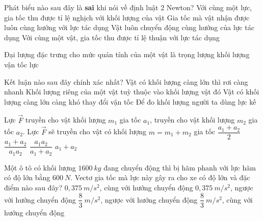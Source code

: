 \begin{ex}%
Phát biểu nào sau đây là \textbf{sai} khi nói về định luật 2 
Newton? 
\choice
{Với cùng một lực, gia tốc thu được tỉ lệ nghịch với khối lượng của vật}
{Gia tốc mà vật nhận được luôn cùng hướng với lực tác dụng}
{\True Vật luôn chuyển động cùng hướng của lực tác dụng}
{Với cùng một vật, gia tốc thu được tỉ lệ thuận với lực tác dụng}
 \end{ex}
\begin{ex}%
Đại lượng đặc trưng cho mức quán tính của một vật là
\choice
{trọng lượng}
{\True khối lượng}
{vận tốc}
{lực}
 \end{ex}
\begin{ex}%
Kết luận nào sau đây chính xác nhất?
\choice
{Vật có khối lượng càng lớn thì rơi càng nhanh}
{Khối lượng riêng của một vật tuỳ thuộc vào khối lượng vật đó}
{\True Vật có khối lượng càng lớn càng khó thay đổi vận tốc}
{Để đo khối lượng người ta dùng lực kế}
  \end{ex}
\begin{ex}%
Lực $\vec{F}$ truyền cho vật khối lượng ${m}_1$ gia tốc ${a}_1$, truyền cho vật khối lượng ${m}_2$ gia tốc ${a}_2$. Lực $\vec{F}$ sẽ truyền cho vật có khối lượng $m=m_1+m_2$ gia tốc
\choice
{$\dfrac{a_1+a_2}{2}$}
{$\dfrac{a_1+a_2}{a_1 a_2}$}
{\True $\dfrac{a_1 a_2}{a_1+a_2}$}
{$a_1+a_2$}
  \end{ex}
\begin{ex}%
Một ô tô có khối lượng $1600\ kg$ đang chuyển động thì bị hãm phanh với lực hãm có độ lớn bằng $600\ N$. Vectơ gia tốc mà lực này gây ra cho xe có độ lớn và đặc điểm nào sau đây?
\choice
{$0,375\ m/s^2$, cùng với hướng chuyển động}
{\True $0,375\ m/s^2$, ngược với hướng chuyển động}
{$\dfrac{8}{3}\ m/s^2$, ngược với hướng chuyển động}
{$\dfrac{8}{3}\ m/s^2$, cùng với hướng chuyển động}
  \end{ex}
